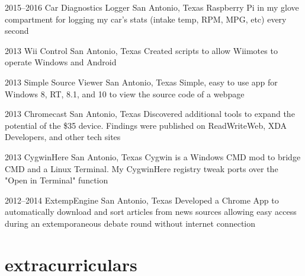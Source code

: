 \documentclass[]{friggeri-cv} %
\begin{document}
\begin{entrylist}

	\entry
	{2015--2016}
	{Car Diagnostics Logger}
	{San Antonio, Texas}
	{Raspberry Pi in my glove compartment for logging my car's stats (intake temp, RPM, MPG, etc) every  second}


	\entry
	{2013}
	{Wii Control}
	{San Antonio, Texas}
	{Created scripts to allow Wiimotes to operate Windows and Android}


	\entry
	{2013}
	{Simple Source Viewer}
	{San Antonio, Texas}
	{Simple, easy to use app for Windows 8, RT, 8.1, and 10 to view the source code of a webpage}


	\entry
	{2013}
	{Chromecast}
	{San Antonio, Texas}
	{Discovered additional tools to expand the potential of the \$35 device. Findings were published on ReadWriteWeb, XDA Developers, and other tech sites}


	\entry
	{2013}
	{CygwinHere}
	{San Antonio, Texas}
	{Cygwin is a Windows CMD mod to bridge CMD and a Linux Terminal. My CygwinHere registry tweak ports over the "Open in Terminal" function}


	\entry
	{2012--2014}
	{ExtempEngine}
	{San Antonio, Texas}
	{Developed a Chrome App to automatically download and sort articles from news sources allowing easy access during an extemporaneous debate round without internet connection}

\end{entrylist}

\section{extracurriculars}
\end{document}
